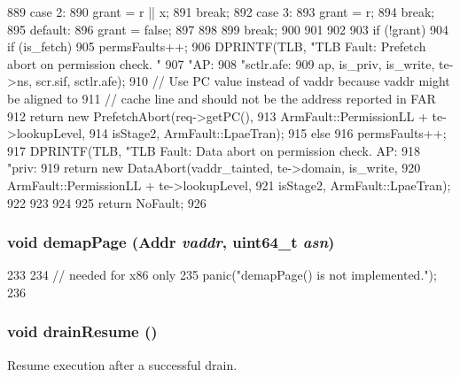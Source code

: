 \begin{DoxyCode}
{{{{{889                   case 2:
890                     grant = r || x;
891                     break;
892                   case 3:
893                     grant = r;
894                     break;
895                   default:
896                     grant = false;
897                 }
898             }
899             break;
900         }
901     }
902 
903     if (!grant) {
904         if (is_fetch) {
905             permsFaults++;
906             DPRINTF(TLB, "TLB Fault: Prefetch abort on permission check. "
907                     "AP:%
908                     "sctlr.afe: %
909                     ap, is_priv, is_write, te->ns, scr.sif, sctlr.afe);
910             // Use PC value instead of vaddr because vaddr might be aligned to
911             // cache line and should not be the address reported in FAR
912             return new PrefetchAbort(req->getPC(),
913                                      ArmFault::PermissionLL + te->lookupLevel,
914                                      isStage2, ArmFault::LpaeTran);
915         } else {
916             permsFaults++;
917             DPRINTF(TLB, "TLB Fault: Data abort on permission check. AP:%
918                     "priv:%
919             return new DataAbort(vaddr_tainted, te->domain, is_write,
920                                  ArmFault::PermissionLL + te->lookupLevel,
921                                  isStage2, ArmFault::LpaeTran);
922         }
923     }
924 
925     return NoFault;
926 }
\end{DoxyCode}
\hypertarget{classArmISA_1_1TLB_a2d698ff909513b48a1263f8a5440e067}{
\subsubsection[{demapPage}]{\setlength{\rightskip}{0pt plus 5cm}void demapPage ({\bf Addr} {\em vaddr}, \/  uint64\_\-t {\em asn})}}
\label{classArmISA_1_1TLB_a2d698ff909513b48a1263f8a5440e067}



\begin{DoxyCode}
233     {
234         // needed for x86 only
235         panic("demapPage() is not implemented.\n");
236     }
\end{DoxyCode}
\hypertarget{classArmISA_1_1TLB_a8f020d3237536fe007fc488c4125c5d8}{
\subsubsection[{drainResume}]{\setlength{\rightskip}{0pt plus 5cm}void drainResume ()}}
\label{classArmISA_1_1TLB_a8f020d3237536fe007fc488c4125c5d8}
Resume execution after a successful drain.

